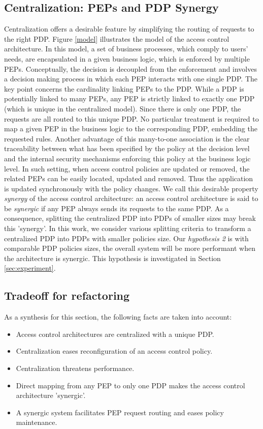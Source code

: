\subsection{Centralization: PEPs and PDP Synergy}
Centralization offers a desirable feature by simplifying the routing of requests to the right PDP. 
Figure \ref{model} illustrates the model of the access control architecture. In this model, a set of business processes, which comply to users' needs, are encapsulated 
in a given business logic, which is enforced by multiple PEPs. Conceptually, the decision is decoupled from the enforcement and involves a decision making process in which each PEP 
interacts with one single PDP. The key point concerns the cardinality linking PEPs to the PDP. While a PDP is potentially linked to many PEPs, any PEP is strictly linked to exactly one 
PDP (which is unique in the centralized model). 
Since there is only one PDP, the requests are all routed to this unique PDP. No particular treatment is required to map a given PEP in the business logic to 
the corresponding PDP, embedding the requested rules. Another advantage of this many-to-one association is the clear traceability between what has been specified by the 
policy at the decision level and the internal security mechanisms enforcing this policy at the business logic level. In such setting, 
when access control policies are updated or removed, the related PEPs can be easily located, updated and removed. Thus the application is updated synchronously 
with the policy changes. We call this desirable property \textit{synergy} of the access control architecture: an access control architecture is said to be \textit{synergic} if any PEP always sends 
its requests  to the same PDP. 
As a consequence, splitting the centralized PDP into PDPs of smaller sizes may break this 'synergy'. In this work, we consider various splitting criteria to transform a centralized PDP into PDPs with 
smaller policies size. 
Our \textit{hypothesis 2} is with comparable PDP policies sizes, the overall system will be more performant when the architecture is synergic. This hypothesis is investigated in 
Section \ref{sec:experiment}.

\subsection{Tradeoff for refactoring }

As a synthesis for this section, the following facts are taken into account:
\begin{itemize}
 \item Access control architectures are centralized with a unique PDP.
\item Centralization eases reconfiguration of an access control policy.
\item Centralization threatens performance.
\item Direct mapping from any PEP to only one PDP makes the access control architecture 'synergic'.
\item A synergic system facilitates PEP request routing and eases policy maintenance.

\end{itemize}

